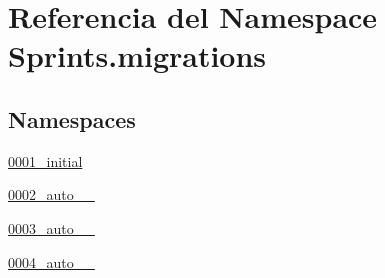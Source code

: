 \hypertarget{namespace_sprints_1_1migrations}{}\section{Referencia del Namespace Sprints.\+migrations}
\label{namespace_sprints_1_1migrations}
\subsection*{Namespaces}
\begin{DoxyCompactItemize}
\item 
 \hyperlink{namespace_sprints_1_1migrations_1_10001__initial}{0001\+\_\+initial}
\item 
 \hyperlink{namespace_sprints_1_1migrations_1_10002__auto__20160610__1357}{0002\+\_\+auto\+\_\+\_}
\item 
 \hyperlink{namespace_sprints_1_1migrations_1_10003__auto__20160610__2303}{0003\+\_\+auto\+\_\+\_}
\item 
 \hyperlink{namespace_sprints_1_1migrations_1_10004__auto__20160630__1356}{0004\+\_\+auto\+\_\+\_}
\end{DoxyCompactItemize}
